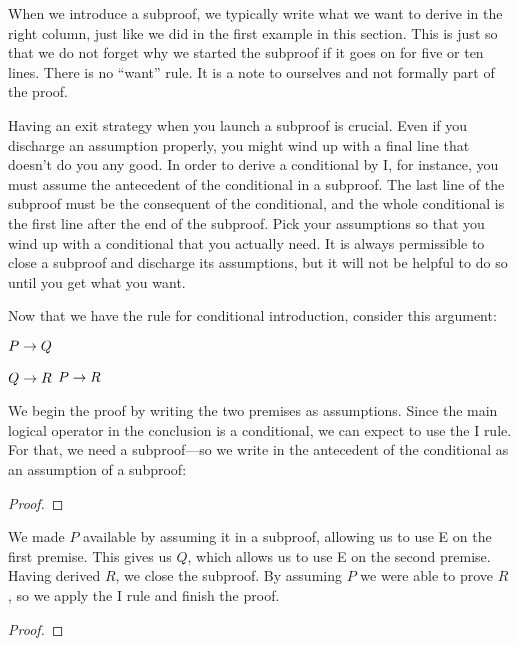 When we introduce a subproof, we typically write what we want to derive in the right column, just like we did in the first example in this section. This is just so that we do not forget why we started the subproof if it goes on for five or ten lines. There is no ``want'' rule. It is a note to ourselves and not formally part of the proof.

Having an exit strategy when you launch a subproof is crucial. Even if you discharge an assumption properly, you might wind up with a final line that doesn't do you any good. In order to derive a conditional by {\eif}I, for instance, you must assume the antecedent of the conditional in a subproof. The last line of the subproof must be the consequent of the conditional, and the whole conditional is the first line after the end of the subproof. Pick your assumptions so that you wind up with a conditional that you actually need. It is always permissible to close a subproof and discharge its assumptions, but it will not be helpful to do so until you get what you want.


Now that we have the rule for conditional introduction, consider this argument:
\label{proofHS}
\begin{earg*}
\item $P \rightarrow Q$
\item $Q \rightarrow R$
\itemc[.15] $P \rightarrow R$
\end{earg*}
We begin the proof by writing the two premises as assumptions. Since the main logical operator in the conclusion is a conditional, we can expect to use the {\eif}I rule. For that, we need a subproof---so we write in the antecedent of the conditional as an assumption of a subproof:

\begin{proof}
	\open
	\close
\end{proof}

We made $P$ available by assuming it in a subproof, allowing us to use {\eif}E on the first premise. This gives us $Q$, which allows us to use {\eif}E on the second premise. Having derived  $R$, we close the subproof. By assuming $P$ we were able to prove $R$, so we apply the {\eif}I rule and finish the proof.

\label{HSproof}
\begin{proof}
	\open
	\close
\end{proof}


